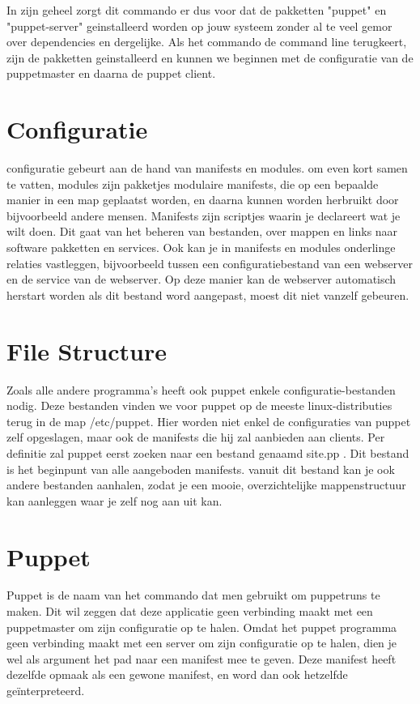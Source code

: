 In zijn geheel zorgt dit commando er dus voor dat de pakketten "puppet" en "puppet-server" geinstalleerd worden op jouw systeem zonder al te veel gemor over dependencies en dergelijke. Als het commando de command line terugkeert, zijn de pakketten geinstalleerd en kunnen we beginnen met de configuratie van de puppetmaster en daarna de puppet client.


\section{Configuratie}
configuratie gebeurt aan de hand van manifests en modules. om even kort samen te vatten, modules zijn pakketjes modulaire manifests, die op een bepaalde manier in een map geplaatst worden, en daarna kunnen worden herbruikt door bijvoorbeeld andere mensen. Manifests zijn scriptjes waarin je declareert wat je wilt doen. Dit gaat van het beheren van bestanden, over mappen en links naar software pakketten en services.
Ook kan je in manifests en modules onderlinge relaties vastleggen, bijvoorbeeld tussen een configuratiebestand van een webserver en de service van de webserver. Op deze manier kan de webserver automatisch herstart worden als dit bestand word aangepast, moest dit niet vanzelf gebeuren.


\section{File Structure}
Zoals alle andere programma's heeft ook puppet enkele configuratie-bestanden nodig. Deze bestanden vinden we voor puppet op de meeste linux-distributies terug in de map /etc/puppet. Hier worden niet enkel de configuraties van puppet zelf opgeslagen, maar ook de manifests die hij zal aanbieden aan clients. Per definitie zal puppet eerst zoeken naar een bestand genaamd site.pp . Dit bestand is het beginpunt van alle aangeboden manifests. vanuit dit bestand kan je ook andere bestanden aanhalen, zodat je een mooie, overzichtelijke mappenstructuur kan aanleggen waar je zelf nog aan uit kan.


\section{Puppet}

Puppet is de naam van het commando dat men gebruikt om puppetruns te maken. Dit wil zeggen dat deze applicatie geen verbinding maakt met een puppetmaster om zijn configuratie op te halen. Omdat het puppet programma geen verbinding maakt met een server om zijn configuratie op te halen, dien je wel als argument het pad naar een manifest mee te geven. Deze manifest heeft dezelfde opmaak als een gewone manifest, en word dan ook hetzelfde geïnterpreteerd.

